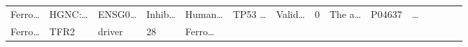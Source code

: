 \documentclass[
]{article}
\begin{document}
\begin{longtable}[]{@{}lllllllllllllll@{}}
\begin{minipage}[t]{0.05\columnwidth}
Ferro\ldots{}\strut
\end{minipage} & \begin{minipage}[t]{0.05\columnwidth}\raggedright
HGNC:\ldots{}\strut
\end{minipage} & \begin{minipage}[t]{0.05\columnwidth}\raggedright
ENSG0\ldots{}\strut
\end{minipage} & \begin{minipage}[t]{0.05\columnwidth}\raggedright
Inhib\ldots{}\strut
\end{minipage} & \begin{minipage}[t]{0.05\columnwidth}\raggedright
Human\ldots{}\strut
\end{minipage} & \begin{minipage}[t]{0.05\columnwidth}\raggedright
TP53 \ldots{}\strut
\end{minipage} & \begin{minipage}[t]{0.05\columnwidth}\raggedright
Valid\ldots{}\strut
\end{minipage} & \begin{minipage}[t]{0.05\columnwidth}\raggedright
0\strut
\end{minipage} & \begin{minipage}[t]{0.05\columnwidth}\raggedright
The a\ldots{}\strut
\end{minipage} & \begin{minipage}[t]{0.05\columnwidth}\raggedright
P04637\strut
\end{minipage} & \begin{minipage}[t]{0.02\columnwidth}\raggedright
\ldots{}\strut
\end{minipage}\tabularnewline
\begin{minipage}[t]{0.05\columnwidth}\raggedright
Ferro\ldots{}\strut
\end{minipage} & \begin{minipage}[t]{0.05\columnwidth}\raggedright
TFR2\strut
\end{minipage} & \begin{minipage}[t]{0.04\columnwidth}\raggedright
driver\strut
\end{minipage} & \begin{minipage}[t]{0.02\columnwidth}\raggedright
28\strut
\end{minipage} & \begin{minipage}[t]{0.05\columnwidth}\raggedright
Ferro\ldots{}\strut
\end{minipage} & \begin{minipage}[t]{0.05\columnwidth}\raggedright

\end{minipage}
\end{longtable}
\end{document}
